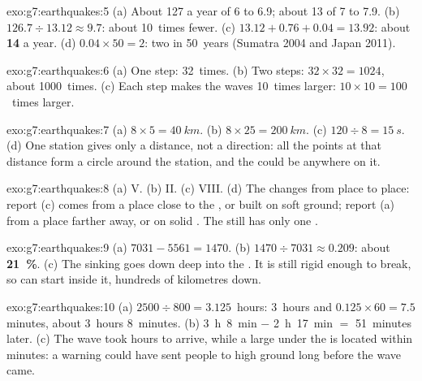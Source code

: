 \begin{solution}{exo:g7:earthquakes:5}
(a) About 127 a year of  6 to 6.9; about 13 of  7 to
7.9. (b) $126.7 \div 13.12 \approx 9.7$: about 10~times fewer. (c)
$13.12 + 0.76 + 0.04 = 13.92$: about \textbf{14} a year. (d)
$0.04 \times 50 = 2$: two in 50~years (Sumatra 2004 and Japan 2011).
\end{solution}

\begin{solution}{exo:g7:earthquakes:6}
(a) One step: 32~times. (b) Two steps: $32 \times 32 = 1024$, about
1000~times. (c) Each step makes the waves 10~times larger: $10 \times 10 =
100$~times larger.
\end{solution}

\begin{solution}{exo:g7:earthquakes:7}
(a) $8 \times 5 = \qty{40}{km}$. (b) $8 \times 25 = \qty{200}{km}$. (c)
$120 \div 8 = \qty{15}{s}$. (d) One station gives only a distance, not a
direction: all the points at that distance form a circle around the
station, and the  could be anywhere on it.
\end{solution}

\begin{solution}{exo:g7:earthquakes:8}
(a) V. (b) II. (c) VIII. (d) The  changes from place to place:
report (c) comes from a place close to the , or built on soft
ground; report (a) from a place farther away, or on solid . The
 still has only one .
\end{solution}

\begin{solution}{exo:g7:earthquakes:9}
(a) $7031 - 5561 = 1470$. (b) $1470 \div 7031 \approx 0.209$: about
\textbf{21~\%}. (c) The sinking  goes down deep into the . It
is still rigid enough to break, so  can start inside it,
hundreds of kilometres down.
\end{solution}

\begin{solution}{exo:g7:earthquakes:10}
(a) $2500 \div 800 = 3.125$~hours: 3~hours and $0.125 \times 60 = 7.5$
minutes, about 3~hours 8~minutes. (b) 3~h~8~min $-$ 2~h~17~min $=$
51~minutes later. (c) The wave took hours to arrive, while a large
 under the  is located within minutes: a warning could have
sent people to high ground long before the wave came.
\end{solution}

